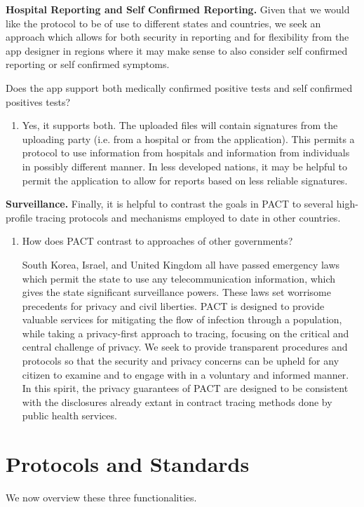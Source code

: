 \documentclass{article}
\begin{document}
\textbf{Hospital Reporting and Self Confirmed Reporting.} 
Given that we would like the protocol to be of use to different states and countries, we seek an approach which allows for both security in reporting and for flexibility from the app designer in regions where it may make sense to also consider self confirmed reporting or self confirmed symptoms.

Does the app support both medically confirmed positive tests and self confirmed positives tests?
\begin{enumerate}[leftmargin=*]

\item Yes, it supports both. The uploaded files will contain signatures from the uploading party (i.e. from a hospital or from the application). This permits a protocol to use information from hospitals and information from individuals in possibly different manner. In less developed nations, it may be helpful to permit the application to allow for reports based on less reliable signatures. 

\end{enumerate}

\textbf{Surveillance.} 
Finally, it is helpful to contrast the goals in PACT to several high-profile tracing protocols and mechanisms employed to date in other countries.

\begin{enumerate}[leftmargin=*]
\item How does PACT contrast to approaches of other governments?

South Korea, Israel, and United Kingdom all have passed emergency laws which permit the state to use any telecommunication information, which gives the state significant surveillance powers. These laws set worrisome precedents for privacy and civil liberties. PACT is designed to provide valuable services for mitigating the flow of infection through a population, while taking a privacy-first approach to tracing, focusing on the critical and central challenge of privacy. We seek to provide transparent procedures and protocols so that the security and privacy concerns can be upheld for any citizen to examine and to engage with in a voluntary and informed manner.  In this spirit, the privacy guarantees of PACT are designed to be consistent with the disclosures already extant in contract tracing methods done by public health services. 

\end{enumerate}

\section{Protocols and Standards} 
We now overview these three functionalities.
\end{document}
